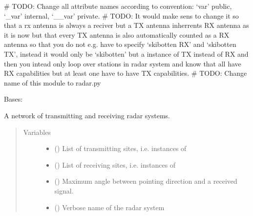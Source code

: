 \documentclass[letterpaper,10pt,english]{sphinxmanual}
\begin{document}
\# TODO: Change all attribute names according to convention: ‘var’ public, ‘\_var’ internal, ‘\_\_var’ private.
\# TODO: It would make sens to change it so that a rx antenna is always a reciver but a TX antenna inherrents RX antenna as it is now but that every TX antenna is also automatically counted as a RX antenna so that you do not e.g. have to specify ‘skibotten RX’ and ‘skibotten TX’, instead it would only be ‘skibotten’ but a instance of TX instead of RX and then you intead only loop over stations in radar system and know that all have RX capabilities but at least one have to have TX capabilities.
\# TODO: Change name of this module to radar.py

\begin{fulllineitems}
\label{\detokenize{modules/radar_config:radar_config.RadarSystem}}
Bases: 

A network of transmitting and receiving radar systems.
\begin{quote}\begin{description}
\item[{Variables}] \leavevmode\begin{itemize}
\item {} 
 () \textendash{} List of transmitting sites, i.e. instances of {\hyperref[\detokenize{modules/antenna:antenna.AntennaTX}]{}}

\item {} 
 () \textendash{} List of receiving sites, i.e. instances of {\hyperref[\detokenize{modules/antenna:antenna.AntennaRX}]{}}

\item {} 
 () \textendash{} Maximum angle between pointing direction and a received signal.

\item {} 
 () \textendash{} Verbose name of the radar system


\end{itemize}
\end{description}
\end{quote}
\end{fulllineitems}
\end{document}
